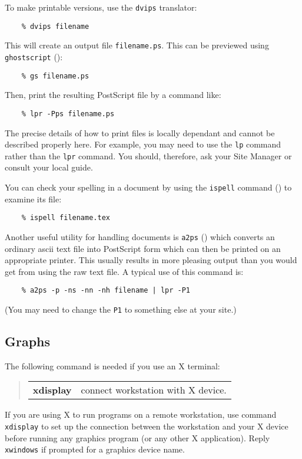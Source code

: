 To make printable versions, use the {\tt dvips} translator:
\begin{verbatim}
    % dvips filename
\end{verbatim}
This will create an output file {\tt filename.ps}. This can be previewed
using {\tt ghostscript}
():
\begin{verbatim}
    % gs filename.ps
\end{verbatim}
Then, print the resulting PostScript file by a command like:
\begin{verbatim}
    % lpr -Pps filename.ps
\end{verbatim}
The precise details of how to print files is locally dependant and cannot
be described properly here.
For example, you may need to use the {\tt lp} command rather than the
{\tt lpr} command.
You should, therefore, ask your Site Manager or consult your local guide.

You can check your spelling in a document by using the {\tt ispell} command
() to examine its file:
\begin{verbatim}
    % ispell filename.tex
\end{verbatim}

Another useful utility for handling documents is {\tt a2ps}
() which
converts an ordinary ascii text file into PostScript form which can then
be printed on an appropriate printer.
This usually results in more pleasing output than you would get from using the
raw text file.
A typical use of this command is:
\begin{verbatim}
    % a2ps -p -ns -nn -nh filename | lpr -P1
\end{verbatim}
(You may need to change the {\tt P1} to something else at your site.)

\subsection{Graphs}

The following command is needed if you use an X terminal:
\begin{quote}
\begin{tabular}{lp{67mm}}

{\bf xdisplay}  & connect workstation with X device.

\end{tabular}
\end{quote}
If you are using X to run programs on a remote workstation, use command
{\tt xdisplay} to set up the connection between the workstation and your X
device before running any graphics program (or any other X application).
Reply {\tt xwindows} if prompted for a graphics device name.

